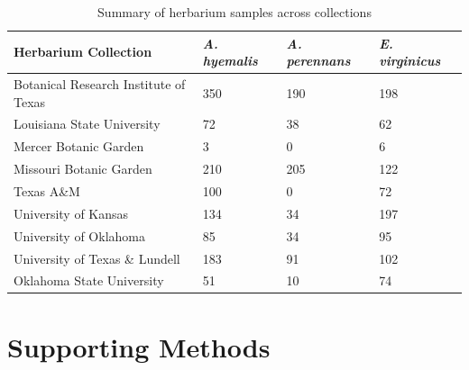 \documentclass[11pt]{article}
\newcommand{\revise}[1]{{\color{black}{#1}}}
\begin{document}
	\begin{table}[h]
		\caption{Summary of herbarium samples across collections \revise{(no. of specimens)}}
		\label{table:herbaria}
		\centering
		\begin{tabular}{llll}\hline
			Herbarium Collection        & \emph{A. hyemalis}        & \emph{A. perennans}      &      \emph{E. virginicus}\\ \hline
			Botanical Research Institute of Texas &   350   &    190&    198    \\
			Louisiana State University &     72  & 38  &   62       \\
			Mercer Botanic Garden &   3    & 0     &     6\\
			Missouri Botanic Garden& 210 & 205 & 122\\
		    Texas A\&M &  100 &0 & 72 \\
		    University of Kansas & 134 & 34 &  197\\
		    University of Oklahoma & 85 &34&  95\\
		    University of Texas  \& Lundell   &  183& 91& 102\\		    				 			     			     
			Oklahoma State University&     51  &   10    &  74 \\ \hline
		\end{tabular}
		\bigskip{}

	\end{table}	
	
	
	\section*{Supporting Methods}
\end{document}

